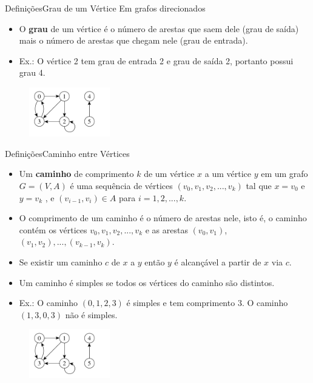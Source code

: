 \documentclass[aspectratio=169]{beamer}
\begin{document}

\begin{frame}{Definições}{Grau de um Vértice}
Em grafos direcionados
\begin{itemize} 
\item O {\bf grau} de um vértice é o número de arestas que saem dele (grau de saída) mais o número de arestas que chegam nele (grau de entrada).
\item Ex.: O vértice 2 tem grau de entrada 2 e grau de saída 2, portanto possui grau 4.
\end{itemize}
\begin{figure}[!h]
  \centering
  \includegraphics[width=100pt]{imagens/exemplo_grafo_direcionado.png}
  \label{fig_exemplo_grau_grafo_direcionado}
\end{figure}
\end{frame}


\begin{frame}{Definições}{Caminho entre Vértices}
\begin{itemize}
\item Um {\bf caminho} de comprimento $k$ de um vértice $x$ a um vértice $y$ em um grafo $G = (V, A)$ é uma sequência de vértices $(v_0 , v_1 , v_2 , ... , v_k)$ tal que $x = v_0$ e $y = v_k$ , e $(v_{i-1}, v_i ) \in A$ para $i = 1, 2, ... , k$.
\item O comprimento de um caminho é o número de arestas nele, isto é, o caminho contém os vértices $v_0 , v_1 , v_2 , ... , v_k$ e as arestas $(v_0 , v_1)$, $(v_1 , v_2), ... , (v_{k-1} , v_k)$.
\item Se existir um caminho $c$ de $x$ a $y$ então $y$ é alcançável a partir de $x$ via $c$.
\item Um caminho é simples se todos os vértices do caminho são distintos.
\item Ex.: O caminho $(0, 1, 2, 3)$ é simples e tem comprimento $3$. O caminho $(1, 3, 0, 3)$ não é simples.
\end{itemize}
\begin{figure}[!h]
  \centering
  \includegraphics[width=100pt]{imagens/exemplo_grafo_direcionado.png}
  \label{fig_exemplo_caminho}
\end{figure}
\end{frame}
\end{document}
